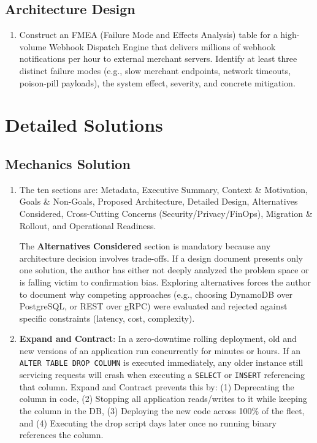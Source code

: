 \subsection*{Architecture Design}
\begin{enumerate}[leftmargin=18pt]
  \item Construct an FMEA (Failure Mode and Effects Analysis) table for a high-volume Webhook Dispatch Engine that delivers millions of webhook notifications per hour to external merchant servers. Identify at least three distinct failure modes (e.g., slow merchant endpoints, network timeouts, poison-pill payloads), the system effect, severity, and concrete mitigation.
\end{enumerate}

\section{Detailed Solutions}

\subsection*{Mechanics Solution}
\begin{enumerate}[leftmargin=18pt]
  \item The ten sections are: Metadata, Executive Summary, Context \& Motivation, Goals \& Non-Goals, Proposed Architecture, Detailed Design, Alternatives Considered, Cross-Cutting Concerns (Security/Privacy/FinOps), Migration \& Rollout, and Operational Readiness.
  
  The \textbf{Alternatives Considered} section is mandatory because any architecture decision involves trade-offs. If a design document presents only one solution, the author has either not deeply analyzed the problem space or is falling victim to confirmation bias. Exploring alternatives forces the author to document why competing approaches (e.g., choosing DynamoDB over PostgreSQL, or REST over gRPC) were evaluated and rejected against specific constraints (latency, cost, complexity).
  
  \item \textbf{Expand and Contract}: In a zero-downtime rolling deployment, old and new versions of an application run concurrently for minutes or hours. If an \texttt{ALTER TABLE DROP COLUMN} is executed immediately, any older instance still servicing requests will crash when executing a \texttt{SELECT} or \texttt{INSERT} referencing that column. Expand and Contract prevents this by: (1) Deprecating the column in code, (2) Stopping all application reads/writes to it while keeping the column in the DB, (3) Deploying the new code across 100\% of the fleet, and (4) Executing the drop script days later once no running binary references the column.
\end{enumerate}

